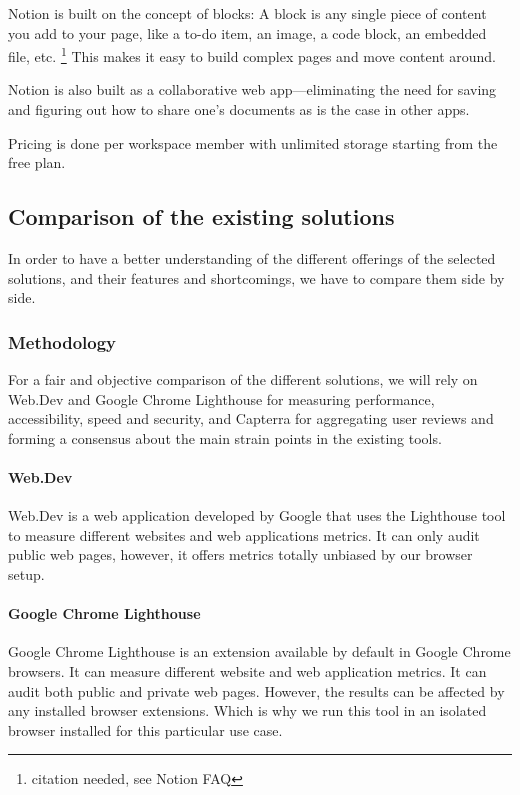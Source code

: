 Notion is built on the concept of blocks: A block is any single piece
of content you add to your page, like a to-do item, an image, a code
block, an embedded file, etc. \footnote{citation needed, see Notion FAQ}
This makes it easy to build complex pages and move content around.

Notion is also built as a collaborative web app---eliminating the need
for saving and figuring out how to share one's documents as is the case
in other apps.

Pricing is done per workspace member with unlimited storage starting
from the free plan.

\subsection{Comparison of the existing solutions}

In order to have a better understanding of the different offerings of the selected solutions, and their features and shortcomings, we have to compare them side by side.

\subsubsection{Methodology}

For a fair and objective comparison of the different solutions, we will rely on Web.Dev and Google Chrome Lighthouse for measuring performance, accessibility, speed and security, and Capterra for aggregating user reviews and forming a consensus about the main strain points in the existing tools.

\paragraph{Web.Dev}

Web.Dev is a web application developed by Google that uses the Lighthouse tool to measure different websites and web applications metrics. It can only audit public web pages, however, it offers metrics totally unbiased by our browser setup.

\paragraph{Google Chrome Lighthouse}


Google Chrome Lighthouse is an extension available by default in Google Chrome browsers.
It can measure different website and web application metrics.
It can audit both public and private web pages. However, the results can be affected by any installed browser extensions.
Which is why we run this tool in an isolated browser installed for this particular use case.

